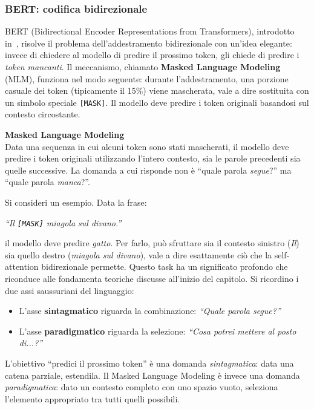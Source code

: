 \subsubsection{BERT: codifica bidirezionale}
\label{subsubsec:bert}
BERT (Bidirectional Encoder Representations from Transformers), introdotto in~\parencite{devlin2018bert}, risolve il problema dell'addestramento bidirezionale con un'idea elegante: invece di chiedere al modello di predire il prossimo token, gli chiede di predire i \textit{token mancanti}.
Il meccanismo, chiamato \textbf{Masked Language Modeling} (MLM), funziona nel modo seguente: durante l'addestramento, una porzione casuale dei token (tipicamente il 15\%) viene mascherata, vale a dire sostituita con un simbolo speciale \texttt{[MASK]}. Il modello deve predire i token originali basandosi sul contesto circostante.
\begin{notebox}
\textbf{Masked Language Modeling}\\
Data una sequenza in cui alcuni token sono stati mascherati, il modello deve predire i token originali utilizzando l'intero contesto, sia le parole precedenti sia quelle successive. La domanda a cui risponde non è ``quale parola \textit{segue}?'' ma ``quale parola \textit{manca}?''.
\end{notebox}
Si consideri un esempio. Data la frase:
\begin{center}
\textit{``Il \texttt{[MASK]} miagola sul divano.''}
\end{center}
il modello deve predire \textit{gatto}. Per farlo, può sfruttare sia il contesto sinistro (\textit{Il}) sia quello destro (\textit{miagola sul divano}), vale a dire esattamente ciò che la self-attention bidirezionale permette.
Questo task ha un significato profondo che riconduce alle fondamenta teoriche discusse all'inizio del capitolo. Si ricordino i due assi saussuriani del linguaggio:
\begin{itemize}
    \item L'asse \textbf{sintagmatico} riguarda la combinazione: \textit{``Quale parola segue?''}
    \item L'asse \textbf{paradigmatico} riguarda la selezione: \textit{``Cosa potrei mettere al posto di...?''}
\end{itemize}
L'obiettivo ``predici il prossimo token'' è una domanda \textit{sintagmatica}: data una catena parziale, estendila. Il Masked Language Modeling è invece una domanda \textit{paradigmatica}: dato un contesto completo con uno spazio vuoto, seleziona l'elemento appropriato tra tutti quelli possibili.
